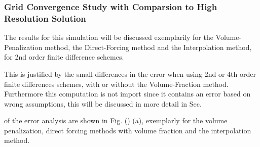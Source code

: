 \clearpage

\subsubsection{Grid Convergence Study with Comparsion to High Resolution Solution}

The results for this simulation will be discussed exemplarily for the Volume-Penalization method, the Direct-Forcing method
and the Interpolation method, for 2nd order finite difference schemes.

This is justified by the small differences in the error  when using 2nd or 4th order finite differences schemes,
with or without the Volume-Fraction method.
Furthermore this computation is not import since it contains an error based on  wrong assumptions,
this will be discussed in more detail in Sec. \label{vali:hpflow_discussion}

of the error analysis are shown in Fig. () (a), exemplarly for the volume penalization, direct forcing  methods with volume fraction
and the interpolation method.

